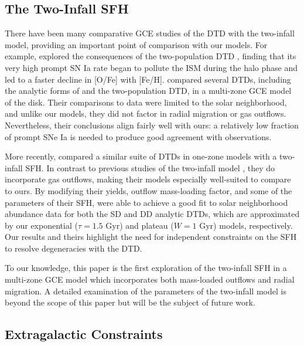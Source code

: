\documentclass[twocolumn,twocolappendix,linenumbers]{aastex631}
\begin{document}
\subsection{The Two-Infall SFH}
\label{sec:two-infall-discussion}

There have been many comparative GCE studies of the DTD with the two-infall model, providing an important point of comparison with our models. For example, \citet{Matteucci2006-BimodalDTDConsequences} explored the consequences of the two-population DTD \citep{Mannucci2006-TwoPopulations}, finding that its very high prompt SN Ia rate began to pollute the ISM during the halo phase and led to a faster decline in [O/Fe] with [Fe/H]. \citet{Matteucci2009-DTDModels} compared several DTDs, including the analytic forms of \citet{Greggio2005-AnalyticalRates} and the two-population DTD, in a multi-zone GCE model of the disk. Their comparisons to data were limited to the solar neighborhood, and unlike our models, they did not factor in radial migration or gas outflows. Nevertheless, their conclusions align fairly well with ours: a relatively low fraction of prompt SNe Ia is needed to produce good agreement with observations.

More recently, \citet{Palicio2023-AnalyticDTD} compared a similar suite of DTDs in one-zone models with a two-infall SFH. In contrast to previous studies of the two-infall model \citep[e.g.,][]{Chiappini1997-TwoInfall,Matteucci2009-DTDModels,Spitoni2021-TwoInfall}, they do incorporate gas outflows, making their models especially well-suited to compare to ours. By modifying their yields, outflow mass-loading factor, and some of the parameters of their SFH, \citet{Palicio2023-AnalyticDTD} were able to achieve a good fit to solar neighborhood abundance data for both the SD and DD analytic DTDs, which are approximated by our exponential ($\tau=1.5$ Gyr) and plateau ($W=1$ Gyr) models, respectively. Our results and theirs highlight the need for independent constraints on the SFH to resolve degeneracies with the DTD.

To our knowledge, this paper is the first exploration of the two-infall SFH in a multi-zone GCE model which incorporates both mass-loaded outflows and radial migration. A detailed examination of the parameters of the two-infall model is beyond the scope of this paper but will be the subject of future work.

\subsection{Extragalactic Constraints}
\end{document}

